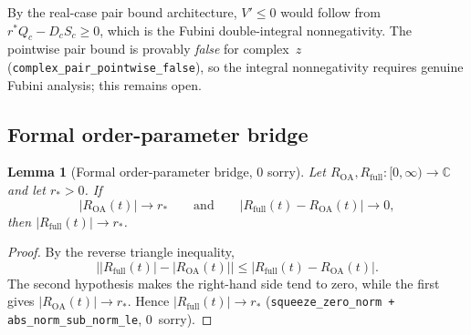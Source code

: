 \documentclass[11pt,a4paper]{article}
\newtheorem{lemma}[theorem]{Lemma}
\theoremstyle{definition}
\newcommand{\C}{\mathbb{C}}
\begin{document}
By the real-case pair bound architecture, $V' \leq 0$ would follow from $r^*Q_c - D_cS_c \geq 0$, which is the Fubini double-integral nonnegativity. The pointwise pair bound is provably \emph{false} for complex~$z$ (\texttt{complex\_pair\_pointwise\_false}), so the integral nonnegativity requires genuine Fubini analysis; this remains open.

\subsection{Formal order-parameter bridge}\label{sec:bridge}

\begin{lemma}[Formal order-parameter bridge, 0 sorry]\label{lem:bridge}
Let $R_{\mathrm{OA}}, R_{\mathrm{full}} : [0,\infty) \to \C$ and let $r_* > 0$. If
\[
|R_{\mathrm{OA}}(t)| \to r_*
\qquad\text{and}\qquad
|R_{\mathrm{full}}(t) - R_{\mathrm{OA}}(t)| \to 0,
\]
then $|R_{\mathrm{full}}(t)| \to r_*$.
\end{lemma}
\begin{proof}
By the reverse triangle inequality,
\[
\bigl||R_{\mathrm{full}}(t)| - |R_{\mathrm{OA}}(t)|\bigr| \leq |R_{\mathrm{full}}(t) - R_{\mathrm{OA}}(t)|.
\]
The second hypothesis makes the right-hand side tend to zero, while the first gives $|R_{\mathrm{OA}}(t)| \to r_*$. Hence $|R_{\mathrm{full}}(t)| \to r_*$ (\texttt{squeeze\_zero\_norm + abs\_norm\_sub\_norm\_le}, 0~sorry).
\end{proof}
\end{document}
